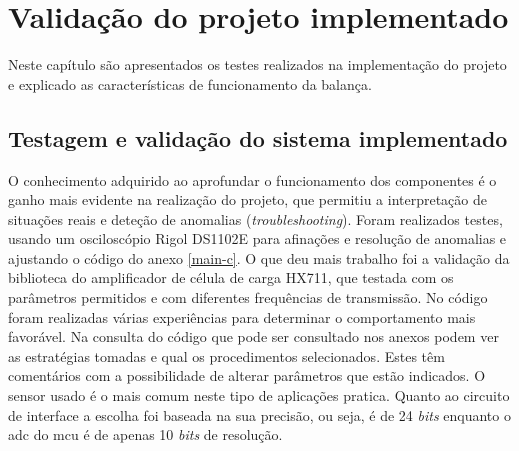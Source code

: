 \chapter{Validação do projeto implementado}
Neste capítulo são apresentados os testes realizados na implementação do projeto e explicado as características de funcionamento da balança.
\newpage
\section{Testagem e validação do sistema implementado}
O conhecimento adquirido ao aprofundar o funcionamento dos componentes é o ganho mais evidente na realização do projeto, que permitiu a interpretação de situações reais e deteção de anomalias (\textit{troubleshooting}).
\emptyline
Foram realizados testes, usando um osciloscópio Rigol DS1102E para afinações e resolução de anomalias e ajustando o código do anexo \ref{main-c}. O que deu mais trabalho foi a validação da biblioteca do amplificador de célula de carga HX711, que testada com os parâmetros permitidos e com diferentes frequências de transmissão. No código foram realizadas várias experiências para determinar o comportamento mais favorável. Na consulta do código que pode ser consultado nos anexos podem ver as estratégias tomadas e qual os procedimentos selecionados. Estes têm comentários com a possibilidade de alterar parâmetros que estão indicados.
\emptyline
O sensor usado é o mais comum neste tipo de aplicações pratica. Quanto ao circuito de interface a escolha foi baseada na sua precisão, ou seja, é de 24 \textit{bits} enquanto o \acs{adc} do \acs{mcu} é de apenas 10 \textit{bits} de resolução.
